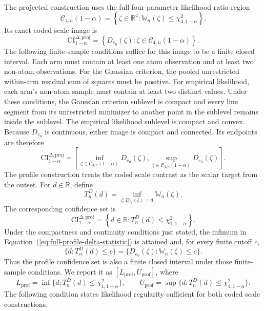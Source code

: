 \documentclass[11pt]{article}
\begin{document}
The projected construction uses the full four-parameter likelihood ratio region
\begin{equation*}
  \mathcal{C}_{4,n}(1-\alpha)
  =
  \left\{
    \zeta\in\mathbb{R}^4:
    \mathbb{W}_n(\zeta)\leq\chi^2_{4,1-\alpha}
  \right\}.
\end{equation*}
Its exact coded scale image is
\begin{equation*}
  \mathrm{CI}^{\Delta,\mathrm{proj}}_{1-\alpha}
  =
  \left\{
    D_{e_0}(\zeta):
    \zeta\in\mathcal{C}_{4,n}(1-\alpha)
  \right\}.
\end{equation*}
The following finite-sample conditions suffice for this image to be a finite closed interval. Each arm must contain at least one atom observation and at least two non-atom observations. For the Gaussian criterion, the pooled unrestricted within-arm residual sum of squares must be positive. For empirical likelihood, each arm's non-atom sample must contain at least two distinct values. Under these conditions, the Gaussian criterion sublevel is compact and every line segment from its unrestricted minimizer to another point in the sublevel remains inside the sublevel. The empirical likelihood sublevel is compact and convex. Because $D_{e_0}$ is continuous, either image is compact and connected. Its endpoints are therefore
\begin{equation}
  \mathrm{CI}^{\Delta,\mathrm{proj}}_{1-\alpha}
  =
  \left[
    \inf_{\zeta\in\mathcal{C}_{4,n}(1-\alpha)}D_{e_0}(\zeta),
    \sup_{\zeta\in\mathcal{C}_{4,n}(1-\alpha)}D_{e_0}(\zeta)
  \right].
  \label{eq:projected-delta-ci}
\end{equation}
The profile construction treats the coded scale contrast as the scalar target from the outset. For $d\in\mathbb{R}$, define
\begin{equation}
  T_n^D(d)
  =
  \inf_{\zeta:D_{e_0}(\zeta)=d}\mathbb{W}_n(\zeta).
  \label{eq:full-profile-delta-statistic}
\end{equation}
The corresponding confidence set is
\begin{equation}
  \mathrm{CI}^{\Delta,\mathrm{prof}}_{1-\alpha}
  =
  \left\{
    d\in\mathbb{R}:T_n^D(d)\leq\chi^2_{1,1-\alpha}
  \right\}.
  \label{eq:profile-delta-ci}
\end{equation}
Under the compactness and continuity conditions just stated, the infimum in Equation~(\ref{eq:full-profile-delta-statistic}) is attained and, for every finite cutoff $c$,
\[
  \{d:T_n^D(d)\leq c\}
  =
  \{D_{e_0}(\zeta):\mathbb{W}_n(\zeta)\leq c\}.
\]
Thus the profile confidence set is also a finite closed interval under those finite-sample conditions. We report it as $[L_{\mathrm{prof}},U_{\mathrm{prof}}]$, where
\[
  L_{\mathrm{prof}}
  =
  \inf\{d:T_n^D(d)\leq\chi^2_{1,1-\alpha}\},
  \qquad
  U_{\mathrm{prof}}
  =
  \sup\{d:T_n^D(d)\leq\chi^2_{1,1-\alpha}\}.
\]
The following condition states likelihood regularity sufficient for both coded scale constructions.
\end{document}
